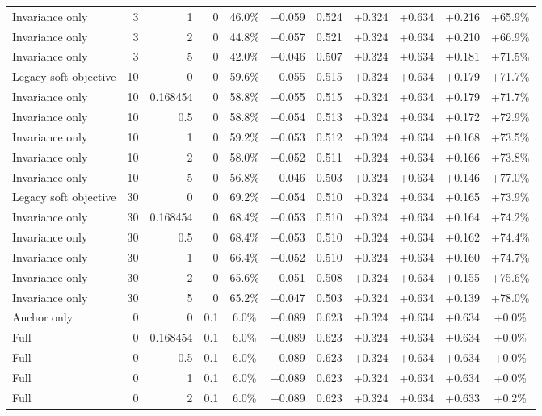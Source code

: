 \begin{table}[htbp]
\begin{tabular}{lrrrccccccc}
Invariance only & 3 & 1 & 0 & 46.0\% & +0.059 & 0.524 & +0.324 & +0.634 & +0.216 & +65.9\% \\
Invariance only & 3 & 2 & 0 & 44.8\% & +0.057 & 0.521 & +0.324 & +0.634 & +0.210 & +66.9\% \\
Invariance only & 3 & 5 & 0 & 42.0\% & +0.046 & 0.507 & +0.324 & +0.634 & +0.181 & +71.5\% \\
Legacy soft objective & 10 & 0 & 0 & 59.6\% & +0.055 & 0.515 & +0.324 & +0.634 & +0.179 & +71.7\% \\
Invariance only & 10 & 0.168454 & 0 & 58.8\% & +0.055 & 0.515 & +0.324 & +0.634 & +0.179 & +71.7\% \\
Invariance only & 10 & 0.5 & 0 & 58.8\% & +0.054 & 0.513 & +0.324 & +0.634 & +0.172 & +72.9\% \\
Invariance only & 10 & 1 & 0 & 59.2\% & +0.053 & 0.512 & +0.324 & +0.634 & +0.168 & +73.5\% \\
Invariance only & 10 & 2 & 0 & 58.0\% & +0.052 & 0.511 & +0.324 & +0.634 & +0.166 & +73.8\% \\
Invariance only & 10 & 5 & 0 & 56.8\% & +0.046 & 0.503 & +0.324 & +0.634 & +0.146 & +77.0\% \\
Legacy soft objective & 30 & 0 & 0 & 69.2\% & +0.054 & 0.510 & +0.324 & +0.634 & +0.165 & +73.9\% \\
Invariance only & 30 & 0.168454 & 0 & 68.4\% & +0.053 & 0.510 & +0.324 & +0.634 & +0.164 & +74.2\% \\
Invariance only & 30 & 0.5 & 0 & 68.4\% & +0.053 & 0.510 & +0.324 & +0.634 & +0.162 & +74.4\% \\
Invariance only & 30 & 1 & 0 & 66.4\% & +0.052 & 0.510 & +0.324 & +0.634 & +0.160 & +74.7\% \\
Invariance only & 30 & 2 & 0 & 65.6\% & +0.051 & 0.508 & +0.324 & +0.634 & +0.155 & +75.6\% \\
Invariance only & 30 & 5 & 0 & 65.2\% & +0.047 & 0.503 & +0.324 & +0.634 & +0.139 & +78.0\% \\
Anchor only & 0 & 0 & 0.1 & 6.0\% & +0.089 & 0.623 & +0.324 & +0.634 & +0.634 & +0.0\% \\
Full & 0 & 0.168454 & 0.1 & 6.0\% & +0.089 & 0.623 & +0.324 & +0.634 & +0.634 & +0.0\% \\
Full & 0 & 0.5 & 0.1 & 6.0\% & +0.089 & 0.623 & +0.324 & +0.634 & +0.634 & +0.0\% \\
Full & 0 & 1 & 0.1 & 6.0\% & +0.089 & 0.623 & +0.324 & +0.634 & +0.634 & +0.0\% \\
Full & 0 & 2 & 0.1 & 6.0\% & +0.089 & 0.623 & +0.324 & +0.634 & +0.633 & +0.2\% \\

\end{tabular}
\end{table}
